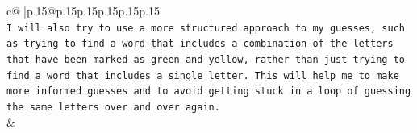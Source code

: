 \documentclass{article}
\begin{document}
{\begin{supertabular}{c@{$\;$}|p{.15\linewidth}@{}p{.15\linewidth}p{.15\linewidth}p{.15\linewidth}p{.15\linewidth}p{.15\linewidth}}
{{{\\ 
\texttt{I will also try to use a more structured approach to my guesses, such as trying to find a word that includes a combination of the letters that have been marked as green and yellow, rather than just trying to find a word that includes a single letter. This will help me to make more informed guesses and to avoid getting stuck in a loop of guessing the same letters over and over again.} \\
            }
        }
    }
    & \\ \\

\end{supertabular}
}
\end{document}
